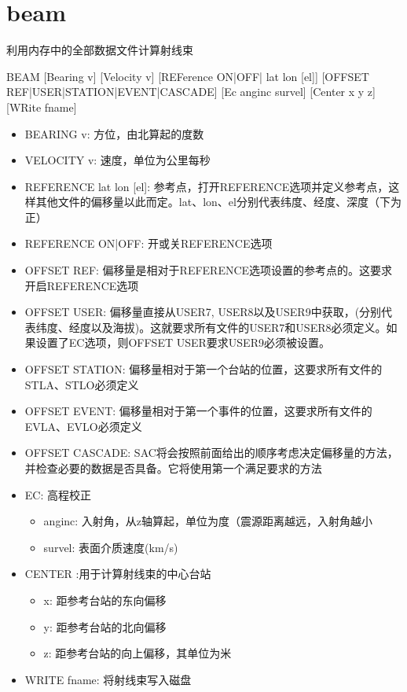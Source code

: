 \section{beam}
\label{cmd:beam}

利用内存中的全部数据文件计算射线束

BEAM [Bearing v] [Velocity v] [REFerence ON|OFF| lat lon [el]] [OFFSET REF|USER|STATION|EVENT|CASCADE] [Ec anginc survel] [Center x y z] [WRite fname]

\begin{itemize}
\item BEARING v: 方位，由北算起的度数
\item VELOCITY v: 速度，单位为公里每秒
\item REFERENCE lat lon [el]: 参考点，打开REFERENCE选项并定义参考点，这样其他文件的偏移量以此而定。lat、lon、el分别代表纬度、经度、深度（下为正）
\item REFERENCE ON|OFF: 开或关REFERENCE选项
\item OFFSET REF: 偏移量是相对于REFERENCE选项设置的参考点的。这要求开启REFERENCE选项
\item OFFSET USER: 偏移量直接从USER7, USER8以及USER9中获取，(分别代表纬度、经度以及海拔)。这就要求所有文件的USER7和USER8必须定义。如果设置了EC选项，则OFFSET USER要求USER9必须被设置。
\item OFFSET STATION: 偏移量相对于第一个台站的位置，这要求所有文件的STLA、STLO必须定义
\item OFFSET EVENT: 偏移量相对于第一个事件的位置，这要求所有文件的EVLA、EVLO必须定义
\item OFFSET CASCADE: SAC将会按照前面给出的顺序考虑决定偏移量的方法，并检查必要的数据是否具备。它将使用第一个满足要求的方法
\item EC: 高程校正
	\begin{itemize}
	\item anginc: 入射角，从z轴算起，单位为度（震源距离越远，入射角越小
	\item survel: 表面介质速度(km/s)
	\end{itemize} 
\item CENTER :用于计算射线束的中心台站
	\begin{itemize}
	\item x: 距参考台站的东向偏移
	\item y: 距参考台站的北向偏移
	\item z: 距参考台站的向上偏移，其单位为米
	\end{itemize}
\item WRITE fname: 将射线束写入磁盘
\end{itemize}

